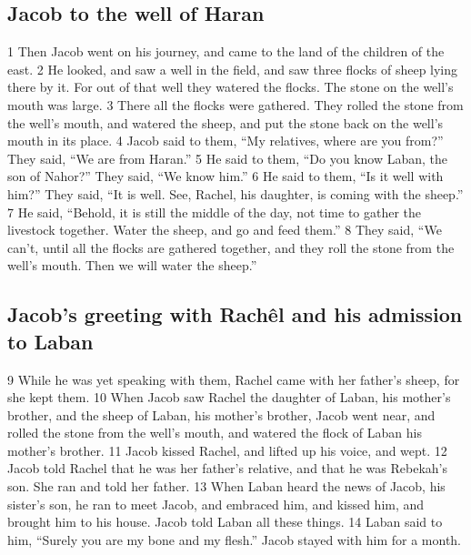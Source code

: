 \hypertarget{jacob-to-the-well-of-haran}{%
\subsection{Jacob to the well of
Haran}\label{jacob-to-the-well-of-haran}}

{1} Then Jacob went on his journey, and came to the land of the children
of the east. {2} He looked, and saw a well in the field, and saw three
flocks of sheep lying there by it. For out of that well they watered the
flocks. The stone on the well's mouth was large. {3} There all the
flocks were gathered. They rolled the stone from the well's mouth, and
watered the sheep, and put the stone back on the well's mouth in its
place. {4} Jacob said to them, ``My relatives, where are you from?''
They said, ``We are from Haran.'' {5} He said to them, ``Do you know
Laban, the son of Nahor?'' They said, ``We know him.'' {6} He said to
them, ``Is it well with him?'' They said, ``It is well. See, Rachel, his
daughter, is coming with the sheep.'' {7} He said, ``Behold, it is still
the middle of the day, not time to gather the livestock together. Water
the sheep, and go and feed them.'' {8} They said, ``We can't, until all
the flocks are gathered together, and they roll the stone from the
well's mouth. Then we will water the sheep.''

\hypertarget{jacobs-greeting-with-rachuxeal-and-his-admission-to-laban}{%
\subsection{Jacob's greeting with Rachêl and his admission to
Laban}\label{jacobs-greeting-with-rachuxeal-and-his-admission-to-laban}}

{9} While he was yet speaking with them, Rachel came with her father's
sheep, for she kept them. {10} When Jacob saw Rachel the daughter of
Laban, his mother's brother, and the sheep of Laban, his mother's
brother, Jacob went near, and rolled the stone from the well's mouth,
and watered the flock of Laban his mother's brother. {11} Jacob kissed
Rachel, and lifted up his voice, and wept. {12} Jacob told Rachel that
he was her father's relative, and that he was Rebekah's son. She ran and
told her father. {13} When Laban heard the news of Jacob, his sister's
son, he ran to meet Jacob, and embraced him, and kissed him, and brought
him to his house. Jacob told Laban all these things. {14} Laban said to
him, ``Surely you are my bone and my flesh.'' Jacob stayed with him for
a month.

